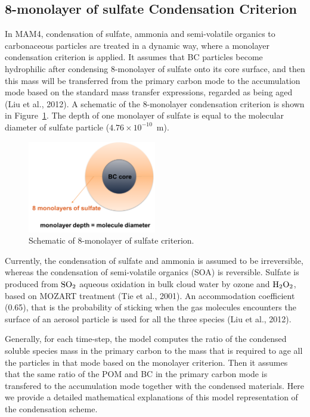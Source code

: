 \documentclass[12pt]{article}
\begin{document}
		
		 \subsection{8-monolayer of sulfate Condensation Criterion}
		
		 In MAM4, condensation of sulfate, ammonia and semi-volatile organics to carbonaceous particles are treated in a dynamic way, where a monolayer condensation criterion is applied. It assumes that BC particles become hydrophilic after condensing 8-monolayer of sulfate onto its core surface, and then this mass will be transferred from the primary carbon mode to the accumulation mode based on the standard mass transfer expressions, regarded as being aged (Liu et al., 2012). A schematic of the 8-monolayer condensation criterion is shown in Figure~\ref{fig_P3}. The depth of one monolayer of sulfate is equal to the molecular diameter of sulfate particle ($4.76\times 10^{-10}$~m).
		 \begin{figure}[H] 
		 	\begin{center}
		 		\includegraphics[width = 0.5\textwidth]{Figure03}
		 		\caption[]{\label{fig_P3} Schematic of 8-monolayer of sulfate criterion.}
		 	\end{center}
		 \end{figure}
		 
		 Currently, the condensation of sulfate and ammonia is assumed to be irreversible, whereas the condensation of semi-volatile organics (SOA) is reversible. Sulfate is produced from $\rm{SO}_{2}$ aqueous oxidation in bulk cloud water by ozone and $\rm{H}_{2}\rm{O}_{2}$, based on MOZART treatment (Tie et al., 2001). An accommodation coefficient (0.65), that is the probability of sticking when the gas molecules encounters the surface of an aerosol particle is used for all the three species (Liu et al., 2012). 
		 
		 Generally, for each time-step, the model computes the ratio of the  condensed soluble species mass in the primary carbon to the mass that is required to age all the particles in that mode based on the monolayer criterion. Then it assumes that the same ratio of the POM and BC in the primary carbon mode is transfered to the accumulation mode together with the condensed materials. Here we provide a detailed mathematical explanations of this model representation of the condensation scheme. 
		 
\end{document}
